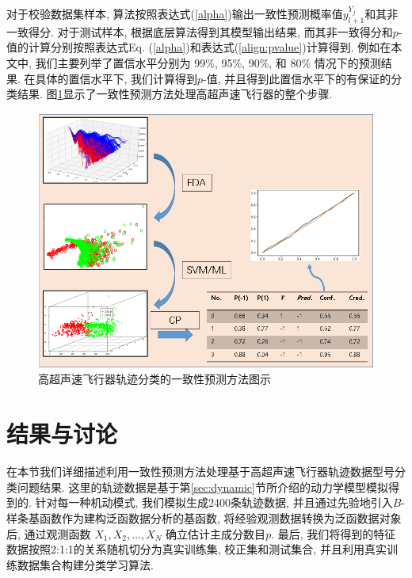 对于校验数据集样本, 算法按照表达式(\ref{alpha})输出一致性预测概率值$y_{l+1}^{Y_{j}}$和其非一致得分. 对于测试样本, 根据底层算法得到其模型输出结果, 而其非一致得分和$p$-值的计算分别按照表达式Eq. (\ref{alpha})和表达式(\ref{align:pvalue})计算得到. 例如在本文中, 我们主要列举了置信水平分别为 99\%, 95\%, 90\%, 和 80\% 情况下的预测结果. 在具体的置信水平下, 我们计算得到$p$-值, 并且得到此置信水平下的有保证的分类结果. 图\ref{fig:flow}显示了一致性预测方法处理高超声速飞行器的整个步骤.

\begin{figure}
\centering
\includegraphics[width=.7\linewidth]{Img/chapter7/Flow.png}
\caption{高超声速飞行器轨迹分类的一致性预测方法图示}
\label{fig:flow}
\end{figure}

\section{结果与讨论}
\label{sec:results}

在本节我们详细描述利用一致性预测方法处理基于高超声速飞行器轨迹数据型号分类问题结果. 这里的轨迹数据是基于第\ref{sec:dynamic}节所介绍的动力学模型模拟得到的. 针对每一种机动模式, 我们模拟生成2400条轨迹数据, 并且通过先验地引入$B$-样条基函数作为建构泛函数据分析的基函数, 将经验观测数据转换为泛函数据对象后, 通过观测函数 $X_1, X_2, \ldots, X_{N}$ 确立估计主成分数目$p$. 最后, 我们将得到的特征数据按照2:1:1的关系\textsf{随机切分}为真实训练集, 校正集和测试集合, 并且利用真实训练数据集合构建分类学习算法.

